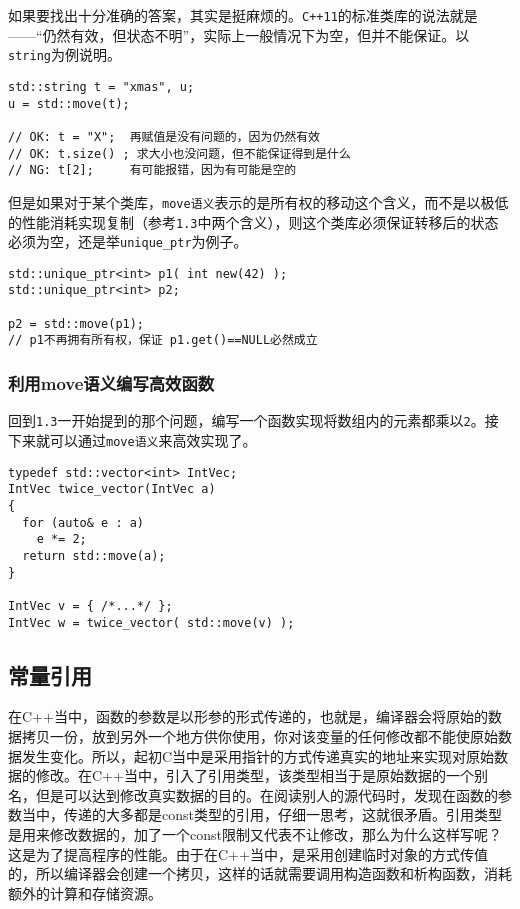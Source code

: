 如果要找出十分准确的答案，其实是挺麻烦的。\texttt{C++11}的标准类库的说法就是------``仍然有效，但状态不明''，实际上一般情况下为空，但并不能保证。以\texttt{string}为例说明。

\begin{lstlisting}
std::string t = "xmas", u;
u = std::move(t);

// OK: t = "X";  再赋值是没有问题的，因为仍然有效
// OK: t.size() ; 求大小也没问题，但不能保证得到是什么
// NG: t[2];     有可能报错，因为有可能是空的
\end{lstlisting}

但是如果对于某个类库，\texttt{move语义}表示的是所有权的移动这个含义，而不是以极低的性能消耗实现复制（参考\texttt{1.3}中两个含义），则这个类库必须保证转移后的状态必须为空，还是举\texttt{unique\_ptr}为例子。

\begin{lstlisting}
std::unique_ptr<int> p1( int new(42) );
std::unique_ptr<int> p2;

p2 = std::move(p1); 
// p1不再拥有所有权，保证 p1.get()==NULL必然成立
\end{lstlisting}

\subsubsection[利用move语义编写高效函数]{\texorpdfstring{\protect\hypertarget{23move_115}{}{}利用move语义编写高效函数}{2.3利用move语义编写高效函数}}\label{ux5229ux7528moveux8bedux4e49ux7f16ux5199ux9ad8ux6548ux51fdux6570}

回到\texttt{1.3}一开始提到的那个问题，编写一个函数实现将数组内的元素都乘以\texttt{2}。接下来就可以通过\texttt{move语义}来高效实现了。

\begin{lstlisting}
typedef std::vector<int> IntVec;
IntVec twice_vector(IntVec a)
{
  for (auto& e : a)
    e *= 2;
  return std::move(a); 
}

IntVec v = { /*...*/ };
IntVec w = twice_vector( std::move(v) );
\end{lstlisting}
\subsection{常量引用}
在C++当中，函数的参数是以形参的形式传递的，也就是，编译器会将原始的数据拷贝一份，放到另外一个地方供你使用，你对该变量的任何修改都不能使原始数据发生变化。所以，起初C当中是采用指针的方式传递真实的地址来实现对原始数据的修改。在C++当中，引入了引用类型，该类型相当于是原始数据的一个别名，但是可以达到修改真实数据的目的。在阅读别人的源代码时，发现在函数的参数当中，传递的大多都是const类型的引用，仔细一思考，这就很矛盾。引用类型是用来修改数据的，加了一个const限制又代表不让修改，那么为什么这样写呢？这是为了提高程序的性能。由于在C++当中，是采用创建临时对象的方式传值的，所以编译器会创建一个拷贝，这样的话就需要调用构造函数和析构函数，消耗额外的计算和存储资源。

